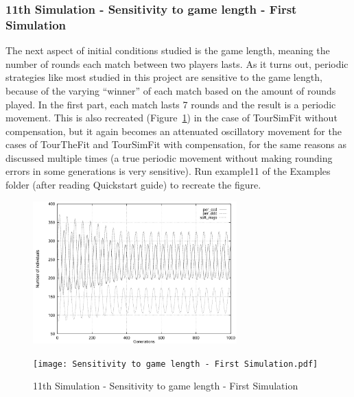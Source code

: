 \subsubsection{11th Simulation - Sensitivity to game length - First Simulation}
The next aspect of initial conditions studied is the game length, meaning the number of rounds each match between two players lasts. As it turns out, periodic strategies like most studied in this project are sensitive to the game length, because of the varying ``winner'' of each match based on the amount of rounds played. In the first part, each match lasts 7 rounds and the result is a periodic movement. This is also recreated (Figure~\ref{fig:Sensitivity to game length - First Simulation}) in the case of TourSimFit without compensation, but it again becomes an attenuated oscillatory movement for the cases of TourTheFit and TourSimFit with compensation, for the same reasons as discussed multiple times (a true periodic movement without making rounding errors in some generations is very sensitive). Run example11 of the Examples folder (after reading Quickstart guide) to recreate the figure.
	\begin{figure}[h]
	    \centering
		\includegraphics[width=0.7\textwidth]{RefPaperFigures/fig9a.jpeg}\par\vspace{0.5em}
	    \texttt{[image: Sensitivity to game length - First Simulation.pdf]}
	    \caption{11th Simulation - Sensitivity to game length - First Simulation}
	    \label{fig:Sensitivity to game length - First Simulation}
	\end{figure}
